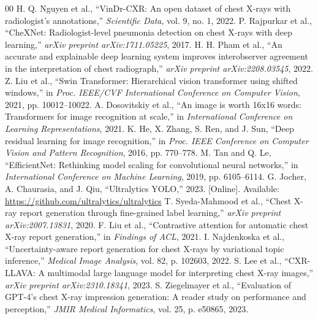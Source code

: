 \documentclass[conference]{IEEEtran}
\begin{document}
\begin{thebibliography}{00}
 H. Q. Nguyen et al., ``VinDr-CXR: An open dataset of chest X-rays with radiologist's annotations,'' \textit{Scientific Data}, vol. 9, no. 1, 2022.
 P. Rajpurkar et al., ``CheXNet: Radiologist-level pneumonia detection on chest X-rays with deep learning,'' \textit{arXiv preprint arXiv:1711.05225}, 2017.
 H. H. Pham et al., ``An accurate and explainable deep learning system improves interobserver agreement in the interpretation of chest radiograph,'' \textit{arXiv preprint arXiv:2208.03545}, 2022.
 Z. Liu et al., ``Swin Transformer: Hierarchical vision transformer using shifted windows,'' in \textit{Proc. IEEE/CVF International Conference on Computer Vision}, 2021, pp. 10012--10022.
 A. Dosovitskiy et al., ``An image is worth 16x16 words: Transformers for image recognition at scale,'' in \textit{International Conference on Learning Representations}, 2021.
 K. He, X. Zhang, S. Ren, and J. Sun, ``Deep residual learning for image recognition,'' in \textit{Proc. IEEE Conference on Computer Vision and Pattern Recognition}, 2016, pp. 770--778.
 M. Tan and Q. Le, ``EfficientNet: Rethinking model scaling for convolutional neural networks,'' in \textit{International Conference on Machine Learning}, 2019, pp. 6105--6114.
 G. Jocher, A. Chaurasia, and J. Qiu, ``Ultralytics YOLO,'' 2023. [Online]. Available: \url{https://github.com/ultralytics/ultralytics}
 T. Syeda-Mahmood et al., ``Chest X-ray report generation through fine-grained label learning,'' \textit{arXiv preprint arXiv:2007.13831}, 2020.
 F. Liu et al., ``Contrastive attention for automatic chest X-ray report generation,'' in \textit{Findings of ACL}, 2021.
 I. Najdenkoska et al., ``Uncertainty-aware report generation for chest X-rays by variational topic inference,'' \textit{Medical Image Analysis}, vol. 82, p. 102603, 2022.
 S. Lee et al., ``CXR-LLAVA: A multimodal large language model for interpreting chest X-ray images,'' \textit{arXiv preprint arXiv:2310.18341}, 2023.
 S. Ziegelmayer et al., ``Evaluation of GPT-4's chest X-ray impression generation: A reader study on performance and perception,'' \textit{JMIR Medical Informatics}, vol. 25, p. e50865, 2023.
\end{thebibliography}
\end{document}

